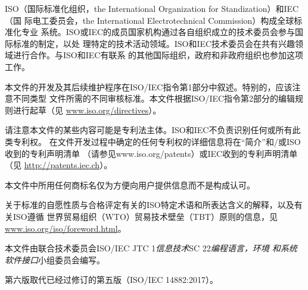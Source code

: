 ISO（国际标准化组织，the International Organization for Standization）和IEC（国
际电工委员会，the International Electrotechnical Commission）构成全球标准化专业
系统。ISO或IEC的成员国家机构通过各自组织成立的技术委员会参与国际标准的制定，以处
理特定的技术活动领域。ISO和IEC技术委员会在共有兴趣领域进行合作。与ISO和IEC有联系
的其他国际组织，政府和非政府组织也参加这项工作。

本文件的开发及其后续维护程序在ISO/IEC指令第1部分中叙述。特别的，应该注意不同类型
文件所需的不同审核标准。本文件根据ISO/IEC指令第2部分的编辑规则进行起草（见
\href{https://www.iso.org/directives}{www.iso.org/directives}）。

请注意本文件的某些内容可能是专利法主体。ISO和IEC不负责识别任何或所有此类专利权。
在文件开发过程中确定的任何专利权的详细信息将在“简介”和/或ISO收到的专利声明清单
（请参见www.iso.org/patents）或IEC收到的专利声明清单（见
\href{http://patents.iec.ch}{http://patents.iec.ch}）。

本文件中所用任何商标名仅为方便向用户提供信息而不是构成认可。

关于标准的自愿性质与合格评定有关的ISO特定术语和所表达含义的解释，以及有关ISO遵循
世界贸易组织（WTO）贸易技术壁垒（TBT）原则的信息，见
\href{www.iso.org/iso/foreword.html}{www.iso.org/iso/foreword.html}。

本文件由联合技术委员会ISO/IEC JTC 1\textit{信息技术}SC 22\textit{编程语言，环境
和系统软件接口}小组委员会编写。

第六版取代已经过修订的第五版（ISO/IEC 14882:2017）。

